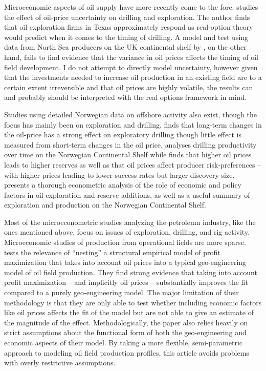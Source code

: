 \documentclass[12pt]{article}
\begin{document}
Microeconomic aspects of oil supply have more recently come to the fore. \citet{kellogg_effect_2014} studies the effect of oil-price uncertainty on drilling and exploration. The author finds that oil exploration firms in Texas approximately respond as real-option theory would predict when it comes to the timing of drilling.  A model and test using data from North Sea producers on the UK continental shelf by \citet{hurn_geology_1994}, on the other hand, fails to find evidence that the variance in oil prices affects the timing of oil field development. I do not attempt to directly model uncertainty, however given that the investments needed to increase oil production in an existing field are to a certain extent irreversible and that oil prices are highly volatile, the results can and probably should be interpreted with the real options framework in mind.  

Studies using detailed Norwegian data on offshore activity also exist, though the focus has mainly been on exploration and drilling.  \citet{mohn_exploration_2008} finds that long-term changes in the oil-price has a strong effect on exploratory drilling though little effect is measured from short-term changes in the oil price. \citet{osmundsen_exploration_2010} analyses drilling productivity over time on the Norwegian Continental Shelf while \citet{mohn_efforts_2008} finds that higher oil prices leads to higher reserves as well as that oil prices affect producer risk-preferences -- with higher prices leading to lower success rates but larger discovery size. \citet{mohn_elastic_2010} presents a thorough econometric analysis of the role of economic and policy factors in oil exploration and reserve additions, as well as a useful summary of exploration and production on the Norwegian Continental Shelf.

Most of the microeconometric studies analyzing the petroleum industry, like the ones mentioned above, focus on issues of exploration, drilling, and rig activity. Microeconomic studies of production from operational fields are more sparse. \citet{black_is_1998} tests the relevance of “nesting” a structural empirical model of profit maximization that takes into account oil prices into a typical geo-engineering model of oil field production.  They find strong evidence that taking into account profit maximization -- and implicitly oil prices -- substantially improves the fit compared to a purely geo-engineering model. The major limitation of their methodology is that they are only able to test whether including economic factors like oil prices affects the fit of the model but are not able to give an estimate of the magnitude of the effect. Methodologically, the paper also relies heavily on strict assumptions about the functional form of both the geo-engineering and economic aspects of their model.  By taking a more flexible, semi-parametric approach to modeling oil field production profiles, this article avoids problems with overly restrictive assumptions. 
\end{document}
